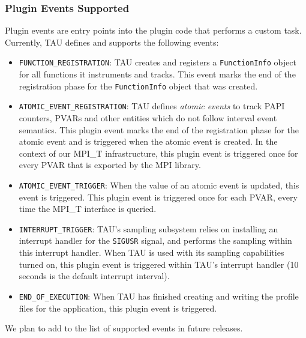 \subsubsection{Plugin Events Supported}
Plugin events are entry points into the plugin code that performs a custom task. Currently, TAU defines and supports the following events:
\begin{itemize}
\item \verb+FUNCTION_REGISTRATION+: TAU creates and registers a \verb+FunctionInfo+ object for all functions it instruments and tracks. This event marks the end of the registration phase for the \verb+FunctionInfo+ object that was created.
\item \verb+ATOMIC_EVENT_REGISTRATION+: TAU defines \textit{atomic events} to track PAPI counters, PVARs and other entities which do not follow interval event semantics. This plugin event marks the end of the registration phase for the atomic event and is triggered when the atomic event is created. In the context of our MPI\_T infrastructure, this plugin event is triggered once for every PVAR that is exported by the MPI library.
\item \verb+ATOMIC_EVENT_TRIGGER+: When the value of an atomic event is updated, this event is triggered. This plugin event is triggered once for each PVAR, every time the MPI\_T interface is queried.
\item \verb+INTERRUPT_TRIGGER+: TAU's sampling subsystem relies on installing an interrupt handler for the \verb+SIGUSR+ signal, and performs the sampling within this interrupt handler. When TAU is used with its sampling capabilities turned on, this plugin event is triggered within TAU's interrupt handler (10 seconds is the default interrupt interval).
\item \verb+END_OF_EXECUTION+: When TAU has finished creating and writing the profile files for the application, this plugin event is triggered.
\end{itemize}
We plan to add to the list of supported events in future releases.

